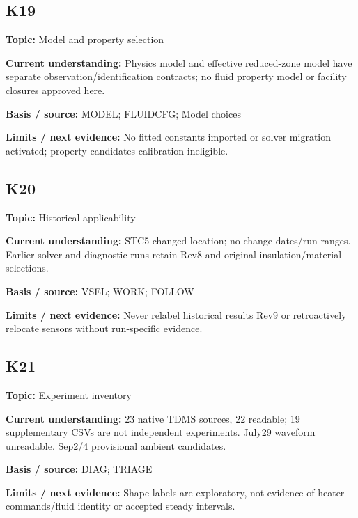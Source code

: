 \documentclass[11pt]{article}
\begin{document}
\par\noindent\begin{minipage}{\textwidth}\small\setlength{\parskip}{2pt}
\subsection*{K19}
\textbf{Topic:} Model and property selection\par
\textbf{Current understanding:} Physics model and effective reduced-zone model have separate observation/identification contracts; no fluid property model or facility closures approved here.\par
\textbf{Basis / source:} MODEL; FLUIDCFG; Model choices\par
\textbf{Limits / next evidence:} No fitted constants imported or solver migration activated; property candidates calibration-ineligible.\par
\end{minipage}\par\vspace{5pt}
\par\noindent\begin{minipage}{\textwidth}\small\setlength{\parskip}{2pt}
\subsection*{K20}
\textbf{Topic:} Historical applicability\par
\textbf{Current understanding:} STC5 changed location; no change dates/run ranges. Earlier solver and diagnostic runs retain Rev8 and original insulation/material selections.\par
\textbf{Basis / source:} VSEL; WORK; FOLLOW\par
\textbf{Limits / next evidence:} Never relabel historical results Rev9 or retroactively relocate sensors without run-specific evidence.\par
\end{minipage}\par\vspace{5pt}
\par\noindent\begin{minipage}{\textwidth}\small\setlength{\parskip}{2pt}
\subsection*{K21}
\textbf{Topic:} Experiment inventory\par
\textbf{Current understanding:} 23 native TDMS sources, 22 readable; 19 supplementary CSVs are not independent experiments. July29 waveform unreadable. Sep2/4 provisional ambient candidates.\par
\textbf{Basis / source:} DIAG; TRIAGE\par
\textbf{Limits / next evidence:} Shape labels are exploratory, not evidence of heater commands/fluid identity or accepted steady intervals.\par
\end{minipage}\par\vspace{5pt}
\end{document}
